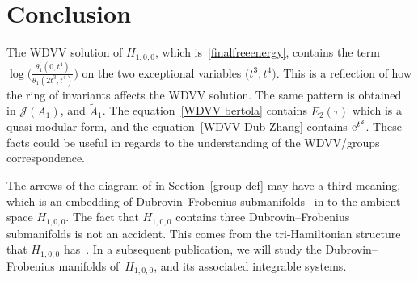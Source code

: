 \documentclass[10pt,a4paper]{amsart}
\numberwithin{equation}{section}
\newcommand{\Ja}{\mathcal{J}}
\begin{document}
\section{Conclusion}
The WDVV solution of $H_{1,0,0}$, which is~\eqref{finalfreeenergy}, contains the term $\log\big(\frac{\theta_1^{\prime}(0,t^4)}{\theta_1(2t^3,t^4)}\big)$ on the two exceptional variables $\big(t^3,t^4\big)$. This is a reflection of how the ring of invariants affects the WDVV solution. The same pattern is obtained in $\Ja(A_1)$, and $\tilde A_1$. The equation~\eqref{WDVV bertola} contains $E_2(\tau)$ which is a quasi modular form, and the equation~\eqref{WDVV Dub-Zhang} contains ${\rm e}^{t^2}$. These facts could be useful in regards to the understanding of the WDVV/groups correspondence.

The arrows of the diagram of in Section~\ref{group def} may have a third meaning, which is an embedding of Dubrovin--Frobenius submanifolds~\cite{Strachan1, Strachan2} in to the ambient space $H_{1,0,0}$. The fact that $H_{1,0,0}$ contains three Dubrovin--Frobenius submanifolds is not an accident. This comes from the tri-Hamiltonian structure that $H_{1,0,0}$ has~\cite{Pavlov2, Romano1}. In a subsequent publication, we will study the Dubrovin--Frobenius manifolds of~$H_{1,0,0}$, and its associated integrable systems.

\appendix
\end{document}
